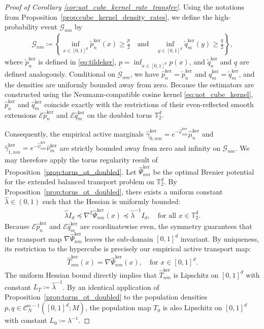 \documentclass[11pt,reqno]{amsart}
\theoremstyle{definition}
\renewcommand{\hat}{\widehat}
\renewcommand{\tilde}{\widetilde}
\begin{document}
\begin{proof}[Proof of Corollary \ref{cor:uot_cube_kernel_rate_transfer}]
Using the notations from Proposition~\ref{prop:cube_kernel_density_rates}, we define the high-probability event $\mathcal{G}_{nm}$ by
\begin{align}
    \mathcal{G}_{nm}
    \coloneqq
    \left\{
        \inf_{x \in [0,1]^d} \tilde p_n^{\mathrm{ker}}(x) \ge \frac{\underline p}{2}
        \quad \text{and} \quad
        \inf_{y \in [0,1]^d} \tilde q_m^{\mathrm{ker}}(y) \ge \frac{\underline q}{2}
    \right\},
\end{align}
where $\tilde p_n^{\mathrm{ker}}$ is defined in \eqref{eq:tildeker}, $\underline p = \inf_{x\in[0,1]^d} p(x)$, and $\tilde q_n^{\mathrm{ker}}$ and $\underline q$ are defined analogously. Conditional on $\mathcal{G}_{nm}$, we have $\hat p_n^{\mathrm{ker}} = \tilde p_n^{\mathrm{ker}}$ and $\hat q_m^{\mathrm{ker}} = \tilde q_m^{\mathrm{ker}}$, and the densities are uniformly bounded away from zero. Because the estimators are constructed using the Neumann-compatible cosine kernel \eqref{eq:uot_cube_kernel}, $\hat p_n^{\mathrm{ker}}$ and $\hat q_m^{\mathrm{ker}}$ coincide exactly with the restrictions of their even-reflected smooth extensions $\mathcal{E}\hat p_n^{\mathrm{ker}}$ and $\mathcal{E}\hat q_m^{\mathrm{ker}}$ on the doubled torus $\mathbb{T}_2^d$.

Consequently, the empirical active marginals $\hat\gamma_{0,nm}^{\mathrm{ker}} = e^{-\hat\varphi_{nm}^{\mathrm{ker}}} \hat\mu_n^{\mathrm{ker}}$ and $ \hat\gamma_{1,nm}^{\mathrm{ker}} = e^{-\hat\psi_{nm}^{\mathrm{ker}}} \hat\nu_m^{\mathrm{ker}}$ are strictly bounded away from zero and infinity on $\mathcal{G}_{nm}$. We may therefore apply the torus regularity result of Proposition~\ref{prop:torus_ot_doubled}. Let $\hat\Psi_{nm}^{\mathrm{ker}}$ be the optimal Brenier potential for the extended balanced transport problem on $\mathbb{T}_2^d$. By Proposition~\ref{prop:torus_ot_doubled}, there exists a uniform constant $\hat\lambda \in (0,1)$ such that the Hessian is uniformly bounded:
\begin{align}
    \hat\lambda I_d \preceq \nabla^2 \hat\Psi_{nm}^{\mathrm{ker}}(x) \preceq \hat\lambda^{-1} I_d, \quad \text{for all } x \in \mathbb{T}_2^d.
\end{align}
Because $\mathcal{E}\hat p_n^{\mathrm{ker}}$ and $\mathcal{E}\hat q_m^{\mathrm{ker}}$ are coordinatewise even, the symmetry guarantees that the transport map $\nabla\hat\Psi_{nm}^{\mathrm{ker}}$ leaves the sub-domain $[0,1]^d$ invariant. By uniqueness, its restriction to the hypercube is precisely our empirical active transport map:
\begin{align}
    \hat T_{nm}^{\mathrm{ker}}(x) = \nabla\hat\Psi_{nm}^{\mathrm{ker}}(x), \quad \text{for } x \in [0,1]^d.
\end{align}
The uniform Hessian bound directly implies that $\hat T_{nm}^{\mathrm{ker}}$ is Lipschitz on $[0,1]^d$ with constant $L_T \coloneqq \hat\lambda^{-1}$. By an identical application of Proposition~\ref{prop:torus_ot_doubled} to the population densities $p, q \in \mathcal{C}_N^{\alpha-1}([0,1]^d; M)$, the population map $T_0$ is also Lipschitz on $[0,1]^d$ with constant $L_0 \coloneqq \lambda^{-1}$.


\end{proof}
\end{document}
